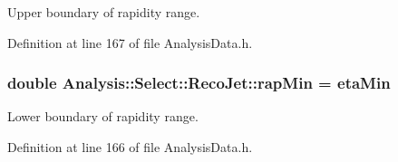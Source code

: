 Upper boundary of rapidity range. 



Definition at line 167 of file Analysis\+Data.\+h.

\subsubsection[{\texorpdfstring{rap\+Min}{rapMin}}]{\setlength{\rightskip}{0pt plus 5cm}double Analysis\+::\+Select\+::\+Reco\+Jet\+::rap\+Min = {\bf eta\+Min}\hspace{0.3cm}{\ttfamily [static]}}\hypertarget{namespaceAnalysis_1_1Select_1_1RecoJet_a5e056f65c8f2f9b0ad358760fc0f4481}{}\label{namespaceAnalysis_1_1Select_1_1RecoJet_a5e056f65c8f2f9b0ad358760fc0f4481}


Lower boundary of rapidity range. 



Definition at line 166 of file Analysis\+Data.\+h.

